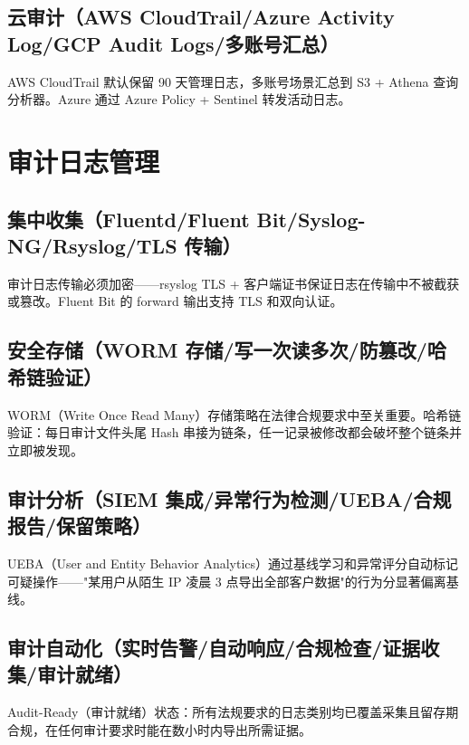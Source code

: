 \documentclass[12pt,UTF8]{ctexbook}
\begin{document}
    \subsection{云审计（AWS CloudTrail/Azure Activity Log/GCP Audit Logs/多账号汇总）}

AWS CloudTrail 默认保留 90 天管理日志，多账号场景汇总到 S3 + Athena 查询分析器。Azure 通过 Azure Policy + Sentinel 转发活动日志。

  \section{审计日志管理}
    \subsection{集中收集（Fluentd/Fluent Bit/Syslog-NG/Rsyslog/TLS 传输）}

审计日志传输必须加密——rsyslog TLS + 客户端证书保证日志在传输中不被截获或篡改。Fluent Bit 的 forward 输出支持 TLS 和双向认证。

    \subsection{安全存储（WORM 存储/写一次读多次/防篡改/哈希链验证）}

WORM（Write Once Read Many）存储策略在法律合规要求中至关重要。哈希链验证：每日审计文件头尾 Hash 串接为链条，任一记录被修改都会破坏整个链条并立即被发现。

    \subsection{审计分析（SIEM 集成/异常行为检测/UEBA/合规报告/保留策略）}

UEBA（User and Entity Behavior Analytics）通过基线学习和异常评分自动标记可疑操作——"某用户从陌生 IP 凌晨 3 点导出全部客户数据"的行为分显著偏离基线。

    \subsection{审计自动化（实时告警/自动响应/合规检查/证据收集/审计就绪）}

Audit-Ready（审计就绪）状态：所有法规要求的日志类别均已覆盖采集且留存期合规，在任何审计要求时能在数小时内导出所需证据。


\end{document}
